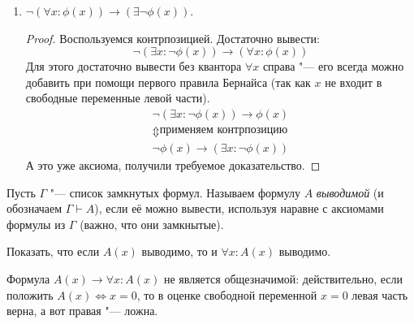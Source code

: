 \begin{exmp}
\begin{enumerate}
\begin{proof}
				Теперь применяем правила Бернайса:
				\begin{gather*}
				    \underbrace{(\forall x \colon \phi)} \to \underbrace{(\exists y \colon \phi)} \\
				    \text{второе правило Бернайса для переменной $y$} \\
					(\exists y \colon \overbrace{\forall x \colon \phi}) \to \overbrace{(\exists y \colon \phi)} \\
					\underbrace{(\exists y \colon \forall x \colon \phi)} \to \underbrace{(\exists y \colon \phi)} \\
				    \text{первое правило Бернайса для переменной $x$} \\
					\overbrace{(\exists y \colon \forall x \colon \phi)} \to \forall x \colon \overbrace{(\exists y \colon \phi)} \\
				\end{gather*}
				Что и требовалось.
			\end{proof}
		\item $\lnot (\forall x \colon \phi(x)) \to (\exists \lnot \phi(x))$.
			\begin{proof}
				Воспользуемся контрпозицией.
				Достаточно вывести:
				\[
					\lnot (\exists x \colon \lnot \phi(x)) \to (\forall x \colon \phi(x))
				\]
				Для этого достаточно вывести без квантора $\forall x$ справа "--- его всегда можно добавить при
				помощи первого правила Бернайса (так как $x$ не входит в свободные переменные левой части).
				\begin{gather*}
					\lnot (\exists x \colon \lnot \phi(x)) \to \phi(x) \\
					\Updownarrow \text{применяем контрпозицию} \\
					\lnot \phi(x) \to \left(\exists x \colon \lnot \phi(x)\right)
				\end{gather*}
				А это уже аксиома, получили требуемое доказательство.
			\end{proof}
	\end{enumerate}
\end{exmp}

\begin{Def}
	Пусть $\Gamma$ "--- список замкнутых формул.
	Называем формулу $A$ \textit{выводимой} (и обозначаем $\Gamma \vdash A$),
	если её можно вывести, используя наравне с аксиомами формулы из $\Gamma$ (важно, что они замкнытые).
\end{Def}
\begin{Exercise}\label{a_x_forall_a_x}
	Показать, что если $A(x)$ выводимо, то и $\forall x \colon A(x)$ выводимо.
\end{Exercise}
\begin{Rem}
	Формула $A(x) \to \forall x \colon A(x)$ не является общезначимой: действительно, если положить $A(x) \iff x = 0$,
	то в оценке свободной переменной $x=0$ левая часть верна, а вот правая "--- ложна.
\end{Rem}

